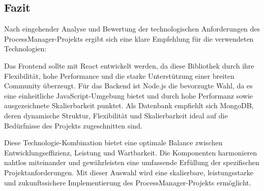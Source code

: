 \subsection{Fazit}
Nach eingehender Analyse und Bewertung der technologischen Anforderungen des ProcessManager-Projekts ergibt sich eine klare Empfehlung für die verwendeten Technologien:

Das Frontend sollte mit React entwickelt werden, da diese Bibliothek durch ihre Flexibilität, hohe Performance und die starke Unterstützung einer breiten Community überzeugt. Für das Backend ist Node.js die bevorzugte Wahl, da es eine einheitliche JavaScript-Umgebung bietet und durch hohe Performanz sowie ausgezeichnete Skalierbarkeit punktet. Als Datenbank empfiehlt sich MongoDB, deren dynamische Struktur, Flexibilität und Skalierbarkeit ideal auf die Bedürfnisse des Projekts zugeschnitten sind.

Diese Technologie-Kombination bietet eine optimale Balance zwischen Entwicklungseffizienz, Leistung und Wartbarkeit. Die Komponenten harmonieren nahtlos miteinander und gewährleisten eine umfassende Erfüllung der spezifischen Projektanforderungen. Mit dieser Auswahl wird eine skalierbare, leistungsstarke und zukunftssichere Implementierung des ProcessManager-Projekts ermöglicht.
